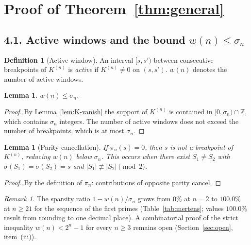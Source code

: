 \documentclass[11pt,a4paper]{amsart}
\theoremstyle{plain}
\newtheorem{lemma}[theorem]{Lemma}
\theoremstyle{definition}
\newtheorem{definition}[theorem]{Definition}
\theoremstyle{remark}
\newtheorem{remark}[theorem]{Remark}
\begin{document}
\section{Proof of Theorem~\ref{thm:general}}
\label{sec:proof-general}

\subsection*{4.1. Active windows and the bound $w(n) \leq \sigma_n$}

\begin{definition}[Active window]
\label{def:active}
An interval $[s, s')$ between consecutive breakpoints of $K^{(n)}$
is \emph{active} if $K^{(n)} \neq 0$ on $(s, s')$.
$w(n)$ denotes the number of active windows.
\end{definition}

\begin{lemma}
\label{lem:w-bound}
$w(n) \leq \sigma_n$.
\end{lemma}

\begin{proof}
By Lemma~\ref{lem:K-vanish} the support of $K^{(n)}$ is contained
in $[0, \sigma_n) \cap \mathbb{Z}$, which contains $\sigma_n$
integers. The number of active windows does not exceed the number
of breakpoints, which is at most $\sigma_n$.
\end{proof}

\begin{lemma}[Parity cancellation]
\label{lem:cancel}
If $\pi_n(s) = 0$, then $s$ is not a breakpoint of $K^{(n)}$,
reducing $w(n)$ below $\sigma_n$.
This occurs when there exist $S_1 \neq S_2$ with
$\sigma(S_1) = \sigma(S_2) = s$ and $|S_1| \not\equiv |S_2| \pmod{2}$.
\end{lemma}

\begin{proof}
By the definition of $\pi_n$: contributions of opposite parity cancel.
\end{proof}

\begin{remark}
\label{rem:cancellation-empirical}
The sparsity ratio
$1 - w(n)/\sigma_n$ grows from $0\%$ at $n=2$
to $100{.}0\%$ at $n \geq 21$ for the sequence of the first primes
(Table~\ref{tab:mertens};
values $100{.}0\%$ result from rounding to one decimal place).
A combinatorial proof of the strict inequality $w(n) < 2^n - 1$
for every $n \geq 3$ remains open
(Section~\ref{sec:open}, item~(iii)).
\end{remark}
\end{document}
